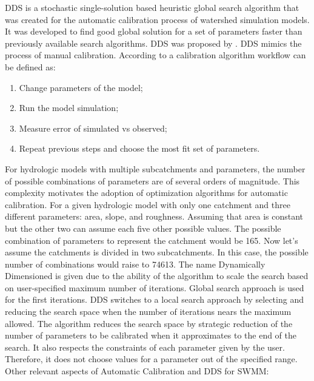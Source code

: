 \acf{DDS} is a stochastic single-solution based heuristic global search algorithm that was created for the automatic calibration process of watershed simulation models. It was developed to find good global solution for a set of parameters faster than previously available search algorithms. DDS was proposed by \citeauthor{tolson2007} \citeyearpar{tolson2007}  \cite{tolson2007}. 
DDS mimics the process of manual calibration. According to \citet{dent2004} a calibration algorithm workflow can be defined as: 
\begin{enumerate}
    \item Change parameters of the model;
    \item Run the model simulation;
    \item Measure error of simulated vs observed;
    \item Repeat previous steps and choose the most fit set of parameters.
\end{enumerate}
For hydrologic models with multiple subcatchments and parameters, the number of possible combinations of parameters are of several orders of magnitude. This complexity motivates the adoption of optimization algorithms for automatic calibration.   
For a given hydrologic model with only one catchment and three different parameters: area, slope, and roughness. Assuming that area is constant but the other two can assume each five other possible values. The possible combination of parameters to represent the catchment would be 165. Now let’s assume the catchments is divided in two subcatchments. In this case, the possible number of combinations would raise to 74613.
The name Dynamically Dimensioned is given due to the ability of the algorithm to scale the search based on user-specified maximum number of iterations. Global search approach is used for the first iterations. DDS switches to a local search approach by selecting and reducing the search space when the number of iterations nears the maximum allowed. The algorithm reduces the search space by strategic reduction of the number of parameters to be calibrated when it approximates to the end of the search. It also respects the constraints of each parameter given by the user. Therefore, it does not choose values for a parameter out of the specified range.
Other relevant aspects of Automatic Calibration and DDS for SWMM:


